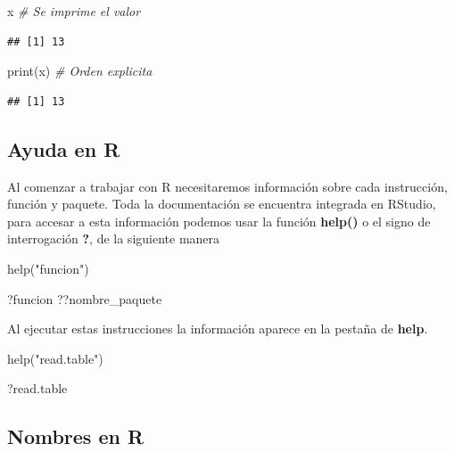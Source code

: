 \documentclass[
  12pt,
]{book}
\newenvironment{Shaded}{\begin{snugshade}}{\end{snugshade}}
\newcommand{\CommentTok}[1]{\textcolor[rgb]{0.56,0.35,0.01}{\textit{#1}}}
\newcommand{\FunctionTok}[1]{\textcolor[rgb]{0.00,0.00,0.00}{#1}}
\newcommand{\NormalTok}[1]{#1}
\newcommand{\StringTok}[1]{\textcolor[rgb]{0.31,0.60,0.02}{#1}}
\begin{document}
\begin{Shaded}
\begin{Highlighting}[]
\NormalTok{x }\CommentTok{\# Se imprime el valor}
\end{Highlighting}
\end{Shaded}

\begin{verbatim}
## [1] 13
\end{verbatim}

\begin{Shaded}
\begin{Highlighting}[]
\FunctionTok{print}\NormalTok{(x) }\CommentTok{\# Orden explicita}
\end{Highlighting}
\end{Shaded}

\begin{verbatim}
## [1] 13
\end{verbatim}

\hypertarget{ayuda-en-r}{%
\subsection{\texorpdfstring{\textbf{Ayuda en R}}{Ayuda en R}}\label{ayuda-en-r}}

Al comenzar a trabajar con R necesitaremos información sobre cada instrucción,
función y paquete. Toda la documentación se encuentra integrada en RStudio, para accesar a esta información podemos usar la función \textbf{help()} o el signo de interrogación \textbf{?}, de la siguiente manera

\begin{Shaded}
\begin{Highlighting}[]
\FunctionTok{help}\NormalTok{(}\StringTok{"funcion"}\NormalTok{)}

\NormalTok{?funcion}
\NormalTok{??nombre\_paquete}
\end{Highlighting}
\end{Shaded}

Al ejecutar estas instrucciones la información aparece en la pestaña de \textbf{help}.

\begin{Shaded}
\begin{Highlighting}[]
\FunctionTok{help}\NormalTok{(}\StringTok{"read.table"}\NormalTok{)}

\NormalTok{?read.table}
\end{Highlighting}
\end{Shaded}

\hypertarget{nombres-en-r}{%
\subsection{\texorpdfstring{\textbf{Nombres en R}}{Nombres en R}}\label{nombres-en-r}}
\end{document}
